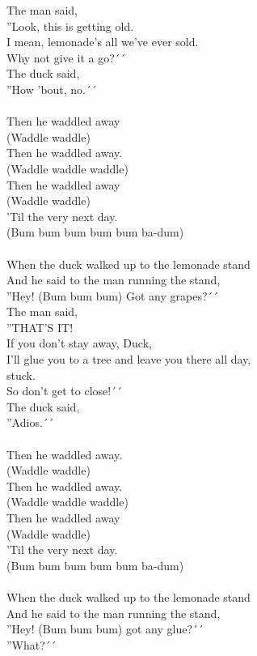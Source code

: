 The man said,\\
''Look, this is getting old.\\
I mean, lemonade's all we've ever sold.\\
Why not give it a go?´´\\
The duck said,\\
''How 'bout, no.´´\\
\\
Then he waddled away\\
(Waddle waddle)\\
Then he waddled away.\\
(Waddle waddle waddle)\\
Then he waddled away\\
(Waddle waddle)\\
'Til the very next day.\\
(Bum bum bum bum bum ba-dum)\\
\\
When the duck walked up to the lemonade stand\\
And he said to the man running the stand,\\
''Hey! (Bum bum bum) Got any grapes?´´\\
The man said,\\
''THAT’S IT!\\
If you don't stay away, Duck,\\
I'll glue you to a tree and leave you there all day,\\
stuck.\\
So don't get to close!´´\\
The duck said,\\
''Adios.´´\\
\\
Then he waddled away.\\
(Waddle waddle)\\
Then he waddled away.\\
(Waddle waddle waddle)\\
Then he waddled away\\
(Waddle waddle)\\
'Til the very next day.\\
(Bum bum bum bum bum ba-dum)\\
\\
When the duck walked up to the lemonade stand\\
And he said to the man running the stand,\\
''Hey! (Bum bum bum) got any glue?´´\\
''What?´´\\
